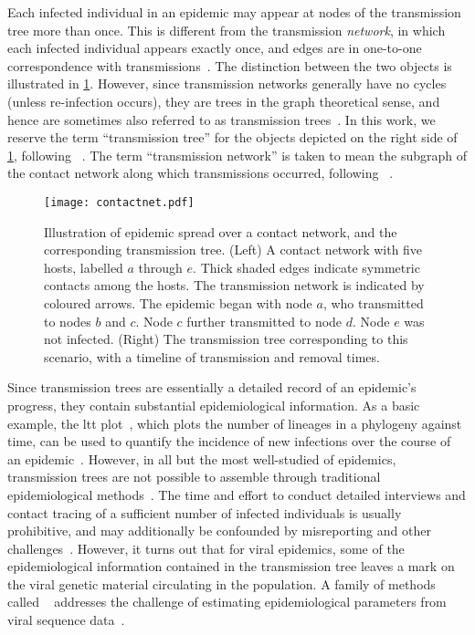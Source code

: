 Each infected individual in an epidemic may appear at nodes of the transmission
tree more than once. This is different from the transmission \emph{network}, in
which each infected individual appears exactly once, and edges are in
one-to-one correspondence with transmissions~\autocite{welch2011statistical,
keeling2005networks}. The distinction between the two objects is illustrated in
\cref{fig:contactnet}. However, since transmission networks generally have no
cycles (unless re-infection occurs), they are trees in the graph theoretical
sense, and hence are sometimes also referred to as transmission
trees~\autocite[\eg][]{kenah2015algorithms}. In this work, we reserve the term
``transmission tree'' for the objects depicted on the right side of
\cref{fig:contactnet}, following \eg~\autocite{stadler2013uncovering}. The term
``transmission network'' is taken to mean the subgraph of the contact network
along which transmissions occurred, following
\eg~\autocite{welch2011statistical, keeling2005networks}.

\begin{figure}
    \centering
    \texttt{[image: contactnet.pdf]}
    \caption[Illustration of a contact network and transmission tree.]{
      Illustration of epidemic spread over a contact network, and the
      corresponding transmission tree. (Left) A contact network with five
      hosts, labelled $a$ through $e$. Thick shaded edges indicate symmetric
      contacts among the hosts. The transmission network is indicated by
      coloured arrows. The epidemic began with node $a$, who transmitted to
      nodes $b$ and $c$. Node $c$ further transmitted to node $d$. Node $e$ was
      not infected. (Right) The transmission tree corresponding to this
      scenario, with a timeline of transmission and removal times.
    }
    \label{fig:contactnet}
\end{figure}

Since transmission trees are essentially a detailed record of an epidemic's
progress, they contain substantial epidemiological information. As a basic
example, the \gls{ltt} plot~\autocite{nee1992tempo}, which plots the number of
lineages in a phylogeny against time, can be used to quantify the incidence of
new infections over the course of an epidemic~\autocite{holmes1995revealing}.
However, in all but the most well-studied of epidemics, transmission trees are
not possible to assemble through traditional epidemiological
methods~\autocite{welch2011statistical}. The time and effort to conduct
detailed interviews and contact tracing of a sufficient number of infected
individuals is usually prohibitive, and may additionally be confounded by
misreporting and other challenges~\autocite{eames2015six}. However, it turns
out that for viral epidemics, some of the epidemiological information contained
in the transmission tree leaves a mark on the viral genetic material
circulating in the population. A family of methods called
~\autocite{grenfell2004unifying} addresses the challenge of
estimating epidemiological parameters from viral sequence
data~\autocite{volz2013viral}.

